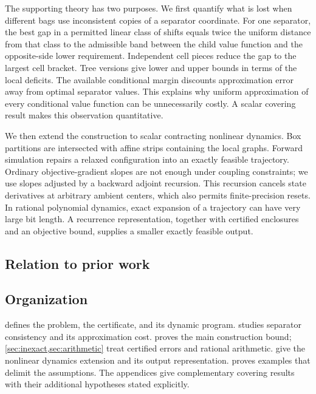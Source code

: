 The supporting theory has two purposes. We first quantify what is lost
when different bags use inconsistent copies of a separator coordinate.
For one separator, the best gap in a permitted linear class of shifts
equals twice the uniform distance from that class to the admissible band
between the child value function and the opposite-side lower requirement.
Independent cell pieces reduce the gap to the largest cell bracket.
Tree versions give lower and upper bounds in
terms of the local deficits. The available conditional margin discounts
approximation error away from optimal separator values. This explains
why uniform approximation of every conditional value function can be
unnecessarily costly. A scalar covering result makes this observation
quantitative.

We then extend the construction to scalar contracting nonlinear dynamics.
Box partitions are intersected with affine strips containing the local
graphs. Forward simulation repairs a relaxed configuration into an
exactly feasible trajectory. Ordinary objective-gradient slopes are not
enough under coupling constraints; we use slopes adjusted by a backward
adjoint recursion. This recursion cancels state derivatives at arbitrary
ambient centers, which also permits finite-precision resets. In rational
polynomial dynamics, exact expansion of a trajectory can have very large
bit length. A recurrence representation, together with certified
enclosures and an objective bound, supplies a smaller exactly feasible
output.

\subsection{Relation to prior work}\label{sec:prior-work}


\subsection{Organization}
 defines the problem, the certificate, and its dynamic
program.  studies separator consistency and its
approximation cost.  proves the main construction
bound; \cref{sec:inexact,sec:arithmetic} treat certified errors and rational
arithmetic.  give the nonlinear dynamics
extension and its output representation.  proves
examples that delimit the assumptions. The appendices give complementary
covering results with their additional hypotheses stated explicitly.
